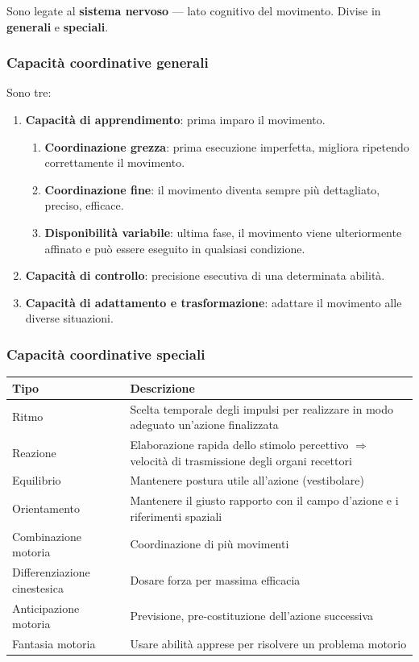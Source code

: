 \documentclass[12pt, a4paper]{article}
\begin{document}
Sono legate al \textbf{sistema nervoso} --- lato cognitivo del movimento. Divise in \textbf{generali} e \textbf{speciali}.

\subsubsection{Capacità coordinative generali}

Sono tre:
\begin{enumerate}
  \item \textbf{Capacità di apprendimento}: prima imparo il movimento.
  \begin{enumerate}
    \item \textbf{Coordinazione grezza}: prima esecuzione imperfetta, migliora ripetendo correttamente il movimento.
    \item \textbf{Coordinazione fine}: il movimento diventa sempre più dettagliato, preciso, efficace.
    \item \textbf{Disponibilità variabile}: ultima fase, il movimento viene ulteriormente affinato e può essere eseguito in qualsiasi condizione.
  \end{enumerate}
  \item \textbf{Capacità di controllo}: precisione esecutiva di una determinata abilità.
  \item \textbf{Capacità di adattamento e trasformazione}: adattare il movimento alle diverse situazioni.
\end{enumerate}

\subsubsection{Capacità coordinative speciali}

\begin{tabularx}{\textwidth}{lX}
\toprule
\rowcolor{light} \textbf{Tipo} & \textbf{Descrizione} \\
\midrule
Ritmo & Scelta temporale degli impulsi per realizzare in modo adeguato un'azione finalizzata \\
Reazione & Elaborazione rapida dello stimolo percettivo $\Rightarrow$ velocità di trasmissione degli organi recettori \\
Equilibrio & Mantenere postura utile all'azione (vestibolare) \\
Orientamento & Mantenere il giusto rapporto con il campo d'azione e i riferimenti spaziali \\
Combinazione motoria & Coordinazione di più movimenti \\
Differenziazione cinestesica & Dosare forza per massima efficacia \\
Anticipazione motoria & Previsione, pre-costituzione dell'azione successiva \\
Fantasia motoria & Usare abilità apprese per risolvere un problema motorio \\
\bottomrule
\end{tabularx}
\end{document}
